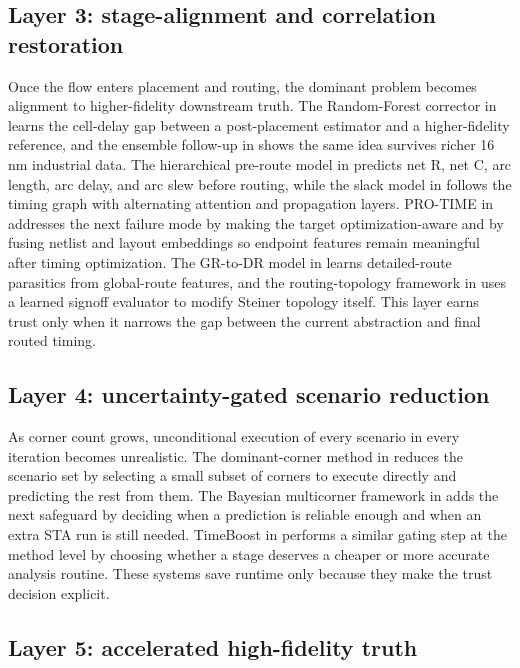 \documentclass[num-refs]{wiley-article}
\begin{document}
  \subsection{Layer 3: stage-alignment and correlation restoration}

  Once the flow enters placement and routing, the dominant problem becomes alignment to higher-fidelity downstream truth. The Random-Forest corrector in \cite{ref25} learns the cell-delay gap between a post-placement estimator and a higher-fidelity reference, and the ensemble follow-up in \cite{ref13} shows the same idea survives richer 16 nm industrial data. The hierarchical pre-route model in \cite{ref17} predicts net R, net C, arc length, arc delay, and arc slew before routing, while the slack model in \cite{ref5} follows the timing graph with alternating attention and propagation layers. PRO-TIME in \cite{ref8} addresses the next failure mode by making the target optimization-aware and by fusing netlist and layout embeddings so endpoint features remain meaningful after timing optimization. The GR-to-DR model in \cite{ref10} learns detailed-route parasitics from global-route features, and the routing-topology framework in \cite{ref7} uses a learned signoff evaluator to modify Steiner topology itself. This layer earns trust only when it narrows the gap between the current abstraction and final routed timing.


  \subsection{Layer 4: uncertainty-gated scenario reduction}

  As corner count grows, unconditional execution of every scenario in every iteration becomes unrealistic. The dominant-corner method in \cite{ref28} reduces the scenario set by selecting a small subset of corners to execute directly and predicting the rest from them. The Bayesian multicorner framework in \cite{ref16} adds the next safeguard by deciding when a prediction is reliable enough and when an extra STA run is still needed. TimeBoost in \cite{ref9} performs a similar gating step at the method level by choosing whether a stage deserves a cheaper or more accurate analysis routine. These systems save runtime only because they make the trust decision explicit.


  \subsection{Layer 5: accelerated high-fidelity truth}
\end{document}
